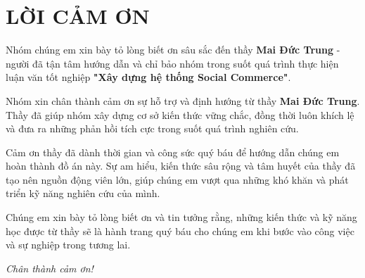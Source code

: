 \section*{LỜI CẢM ƠN}
\thispagestyle{empty}

\vspace{0.5cm}

Nhóm chúng em xin bày tỏ lòng biết ơn sâu sắc đến thầy \textbf{Mai Đức Trung} - người đã tận tâm hướng dẫn và chỉ bảo nhóm trong suốt quá trình thực hiện luận văn tốt nghiệp \textbf{"Xây dựng hệ thống Social Commerce"}.

Nhóm xin chân thành cảm ơn sự hỗ trợ và định hướng từ thầy \textbf{Mai Đức Trung}. Thầy đã giúp nhóm xây dựng cơ sở kiến thức vững chắc, đồng thời luôn khích lệ và đưa ra những phản hồi tích cực trong suốt quá trình nghiên cứu.

Cảm ơn thầy đã dành thời gian và công sức quý báu để hướng dẫn chúng em hoàn thành đồ án này. Sự am hiểu, kiến thức sâu rộng và tâm huyết của thầy đã tạo nên nguồn động viên lớn, giúp chúng em vượt qua những khó khăn và phát triển kỹ năng nghiên cứu của mình.

Chúng em xin bày tỏ lòng biết ơn và tin tưởng rằng, những kiến thức và kỹ năng học được từ thầy sẽ là hành trang quý báu cho chúng em khi bước vào công việc và sự nghiệp trong tương lai.

\vspace{1cm}
\begin{flushright}
    \textit{Chân thành cảm ơn!}
\end{flushright}

\clearpage